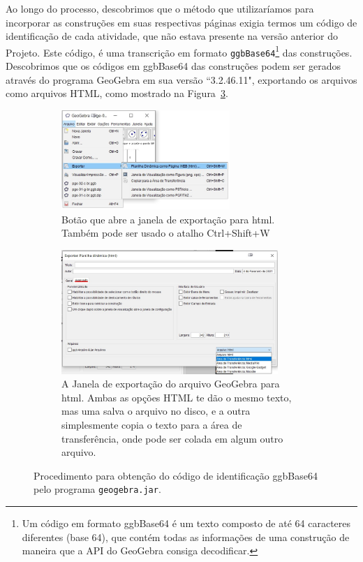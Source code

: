 Ao longo do processo, descobrimos que o método que utilizaríamos para incorporar as construções em suas respectivas páginas exigia termos um código de identificação de cada atividade, que não estava presente na versão anterior do Projeto. Este código, é uma transcrição em formato \texttt{ggbBase64}\footnote{Um código em formato ggbBase64 é um texto composto de até 64 caracteres diferentes (base 64), que contém todas as informações de uma construção de maneira que a API do GeoGebra consiga decodificar.} das construções. Descobrimos que os códigos em ggbBase64 das construções podem ser gerados através do programa GeoGebra em sua versão ``3.2.46.11", exportando os arquivos como arquivos HTML, como mostrado na Figura~\ref{get-ggbBase64}.

\begin{figure}[htb]
    \centering
    
    \begin{subfigure}{\textwidth}
    \centering
    \includegraphics[width=0.7\textwidth]{media/tec-get-ggbBase64-01}
    \caption{Botão que abre a janela de exportação para html. Também pode ser usado o atalho Ctrl+Shift+W}
    \label{fig:getggb1}
    \end{subfigure}
    
    \begin{subfigure}{\textwidth}
    \centering
    \includegraphics[width=0.9\textwidth]{media/tec-get-ggbBase64-02}
    \caption{A Janela de exportação do arquivo GeoGebra para html. Ambas as opções HTML te dão o mesmo texto, mas uma salva o arquivo no disco, e a outra simplesmente copia o texto para a área de transferência, onde pode ser colada em algum outro arquivo.}
    \label{fig:getggb2}
    \end{subfigure}
    \caption{Procedimento para obtenção do código de identificação ggbBase64 pelo programa \texttt{geogebra.jar}.}
    \label{get-ggbBase64}
\end{figure}

